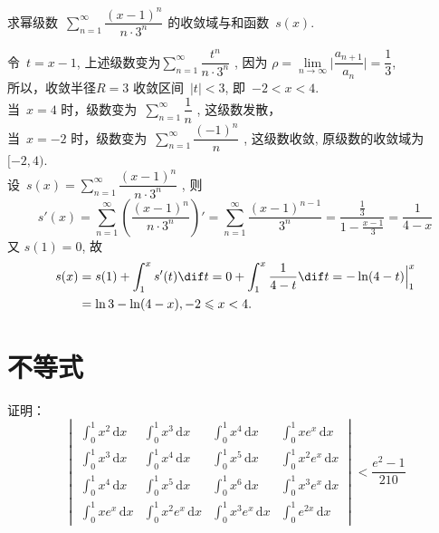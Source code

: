 \documentclass[color=green,titlestyle=hang]{elegantbook}%
\begin{document}
\begin{exercise}
求幂级数~$\sum\limits_{n=1}^\infty\dfrac{(x-1)^n}{n\cdot3^n} $ 的收敛域与和函数~$s(x)$.
\end{exercise}\begin{Solution}
令~$t = x-1$, 上述级数变为$\sum\limits_{n=1}^\infty\dfrac{t^n}{n\cdot3^n} $ ,
因为 $\rho = \lim\limits_{n\rightarrow\infty}\Big| \dfrac{a_{n+1}}{a_{n}}\Big| = \dfrac{1}{3}$, \\
所以，收敛半径$R=3 $ 收敛区间~$|t|<3$, 即~$-2<x<4$. \\
当~$x = 4$ 时，级数变为~$\sum\limits_{n=1}^\infty\dfrac{1}{n}$ , 这级数发散，\\
当~$x = -2$ 时，级数变为~$\sum\limits_{n=1}^\infty\dfrac{(-1)^n}{n}$ , 这级数收敛, 原级数的收敛域为~$[-2,4)$.  \\
设~$s(x) = \sum\limits_{n=1}^\infty\dfrac{(x-1)^n}{n\cdot3^n}$ , 则
\[s'(x) = \sum\limits_{n=1}^\infty\left(\dfrac{(x-1)^n}{n\cdot3^n}\right)' = \sum\limits_{n=1}^\infty\dfrac{(x-1)^{n-1}}{3^n} = \dfrac{\frac{1}{3}}{1-\frac{x-1}{3}}=\dfrac{1}{4-x}\]
又 $s(1) = 0$, 故
\begin{align*}
s(x) &= s(1)+\int_1^x s'(t)\dif t = 0 + \int_1^x\dfrac{1}{4-t}\dif t=-\ln(4-t)\Big|_1^x \\
&= \ln3-\ln(4-x),-2\leqslant x<4.
\end{align*}
\end{Solution}

\chapter{不等式}

\begin{exercise}
证明：\begin{equation*}\begin{vmatrix}
\int_{0}^{1}x^2\,\mathrm{d}x&\int_{0}^{1}x^3\,\mathrm{d}x &\int_{0}^{1}x^4\,\mathrm{d}x&\int_{0}^{1}xe^x\,\mathrm{d}x\\[4mm]
\int_{0}^{1}x^3\,\mathrm{d}x&\int_{0}^{1}x^4\,\mathrm{d}x &\int_{0}^{1}x^5\,\mathrm{d}x&\int_{0}^{1}x^2e^x\,\mathrm{d}x\\[4mm]
\int_{0}^{1}x^4\,\mathrm{d}x&\int_{0}^{1}x^5\,\mathrm{d}x &\int_{0}^{1}x^6\,\mathrm{d}x&\int_{0}^{1}x^3e^x\,\mathrm{d}x\\[4mm]
\int_{0}^{1}xe^x\,\mathrm{d}x&\int_{0}^{1}x^2e^x\,\mathrm{d}x&\int_{0}^{1}x^3e^x\,\mathrm{d}x&\int_{0}^{1}e^{2x}\,\mathrm{d}x
\end{vmatrix}<\frac{e^2-1}{210}\end{equation*}					
\end{exercise}\begin{Solution}
\end{Solution}
\end{document}

